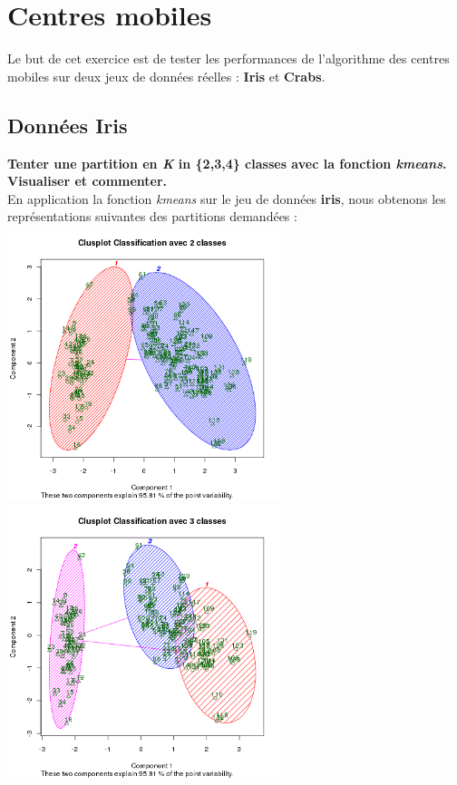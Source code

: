 \documentclass[a4paper, 10pt]{article}
\begin{document}
\section{Centres mobiles}
Le but de cet exercice est de tester les performances de l'algorithme des centres mobiles sur deux jeux de donn\'ees r\'eelles :
\textbf{Iris} et \textbf{Crabs}.

\subsection{Donn\'ees Iris}
\textbf{Tenter une partition en \textit{K} in \{2,3,4\} classes avec la fonction \textit{kmeans}.
Visualiser et commenter.}\\
En application la fonction \textit{kmeans} sur le jeu de donn\'ees \textbf{iris}, nous obtenons les repr\'esentations suivantes des partitions
demand\'ees :\\
\includegraphics[height = 8cm, width = 8cm]{plots/clusplot_kmeans_1.png}
\includegraphics[height = 8cm, width = 8cm]{plots/clusplot_kmeans_4.png}\\
\end{document}
